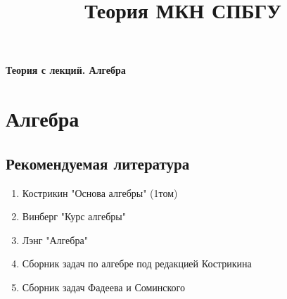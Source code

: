 \documentclass{article}
\title{Теория МКН СПБГУ}
\begin{document}
\begin{titlepage}
\begin{center}
{\LARGE \textbf{Теория с лекций. Алгебра}}
\end{center}
\begin{figure}[h]
\centering
\end{figure}
\end{titlepage}

\begin{titlepage}
\clearpage
\textcolor{blue}{\tableofcontents}
\end{titlepage}

\section{Алгебра}
\subsection*{Рекомендуемая литература}
 \begin{enumerate}
 \item Кострикин "Основа алгебры" (1том)
 \item Винберг "Курс алгебры"
 \item Лэнг "Алгебра"
 \item Сборник задач по алгебре под редакцией Кострикина
 \item Сборник задач Фадеева и Соминского
 \end{enumerate}
  
\end{document}

